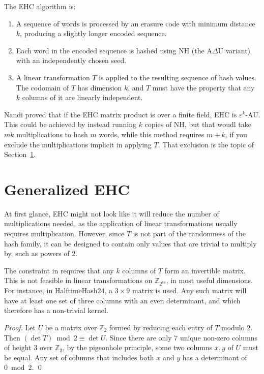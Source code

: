 \documentclass[runningheads]{llncs}
\newcommand{\ints}{\mathbb{Z}}
\begin{document}
The EHC algorithm is:
\begin{enumerate}
\item A sequence of words is processed by an erasure code with minimum distance $k$, producing a slightly longer encoded sequence.
\item Each word in the encoded sequence is hashed using NH (the A$\Delta$U variant) with an independently chosen seed.
\item A linear transformation $T$ is applied to the resulting sequence of hash values.
  The codomain of $T$ has dimension $k$, and $T$ must have the property that any $k$ columns of it are linearly independent.
\end{enumerate}

Nandi proved that if the EHC matrix product is over a finite field, EHC is $\varepsilon^k$-AU.
This could be achieved by instead running $k$ copies of NH, but that woudl take $mk$ multiplications to hash $m$ words, while this method requires $m+k$, if you exclude the multiplications implicit in applying $T$.
That exclusion is the topic of Section~\ref{gehc}.

\section{Generalized EHC}
\label{gehc}

At first glance, EHC might not look like it will reduce the number of multiplications needed, as the application of linear transformations usually requires multiplication.
However, since $T$ is not part of the randomness of the hash family, it can be designed to contain only values that are trivial to multiply by, such as powers of $2$.

The constraint in \cite{ehc-nandi} requires that any $k$ columns of $T$ form an invertible matrix.
This is not feasible in  linear transformations on $\ints_{2^{64}}$, in most useful dimensions.
For instance, in HalftimeHash24, a $3 \times 9$ matrix is used.
Any such matrix will have at least one set of three columns with an even determinant, and which therefore has a non-trivial kernel.

\begin{proof}
  Let $U$ be a matrix over $\ints_2$ formed by reducing each entry of $T$ modulo $2$.
  Then $(\det T) \bmod 2 \equiv \det U$.
  Since there are only 7 unique non-zero columns of height 3 over $\ints_2$, by the pigeonhole principle, some two columns $x, y$ of $U$ must be equal.
  Any set of columns that includes both $x$ and $y$ has a determinant of $0 \bmod 2$.
  \qed
\end{proof}
\end{document}
